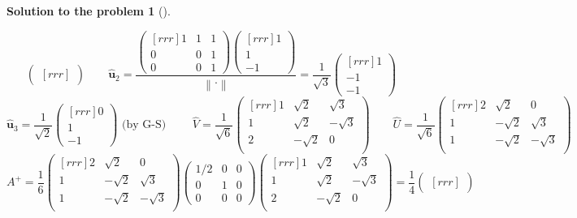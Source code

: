 \documentclass[12pt,a4]{article}
\newtheorem{solution}{Solution to the problem}
\newcommand{\bu}{{\mathbf u}}
\newcommand{\norm}[1]{\left\lVert#1\right\rVert}
\begin{document}
\begin{solution}[]
\begin{enumerate}[(a)]
\[\begin{pmatrix}[rrr]
\end{pmatrix}
\qquad
\hat \bu_2 = \frac{
\begin{pmatrix}[rrr]
1 & 1 & 1 \\
0 & 0 & 1 \\
0 & 0 & 1
\end{pmatrix}
\begin{pmatrix}[rrr] 
1 \\ 1 \\ -1
\end{pmatrix}}{\norm{\cdot}}
= \frac1{\sqrt3}
\begin{pmatrix}[rrr] 
1 \\ -1 \\ -1
\end{pmatrix}
\]
\[
\hat \bu_3 = \frac1{\sqrt2}
\begin{pmatrix}[rrr] 
0 \\ 1 \\ -1
\end{pmatrix} \text{ (by G-S) }
\qquad
\hat V = \frac1{\sqrt6}
\begin{pmatrix}[rrr] 
1 & \sqrt2 & \sqrt3\\
1 & \sqrt2 & -\sqrt3\\
2 & -\sqrt2 & 0\\
\end{pmatrix}
\qquad
\hat U = \frac1{\sqrt6}
\begin{pmatrix}[rrr] 
2 & \sqrt2 & 0\\
1 & -\sqrt2 & \sqrt3\\
1 & -\sqrt2 & -\sqrt3\\
\end{pmatrix}
\]
\[
A^+ = \frac16
\begin{pmatrix}[rrr] 
2 & \sqrt2 & 0\\
1 & -\sqrt2 & \sqrt3\\
1 & -\sqrt2 & -\sqrt3\\
\end{pmatrix}
\begin{pmatrix}
1/2 & 0 & 0 \\
0 & 1 & 0 \\
0 & 0 & 0
\end{pmatrix}
\begin{pmatrix}[rrr] 
1 & \sqrt2 & \sqrt3\\
1 & \sqrt2 & -\sqrt3\\
2 & -\sqrt2 & 0\\
\end{pmatrix}
= \frac14
\begin{pmatrix}[rrr] 

\end{pmatrix}\]
\end{enumerate}
\end{solution}
\end{document}
